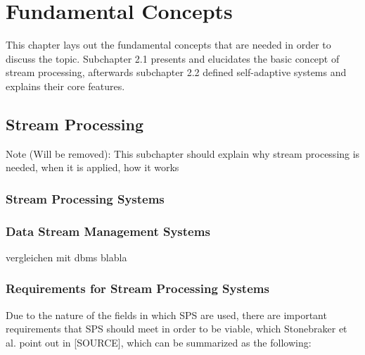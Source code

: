 \chapter{Fundamental Concepts}
This chapter lays out the fundamental concepts that are needed in order to discuss the topic.
Subchapter 2.1 presents and elucidates the basic concept of stream processing, afterwards
subchapter 2.2 defined self-adaptive systems and explains their core features.
    \section{Stream Processing}
    Note (Will be removed): This subchapter should explain why stream processing is needed, when it is applied, how it works
    
        \subsection{Stream Processing Systems}
        \subsection{Data Stream Management Systems}
        vergleichen mit dbms blabla


        \subsection{Requirements for Stream Processing Systems}
        Due to the nature of the fields in which SPS are used, there are important requirements that SPS should meet in order to be viable, 
        which Stonebraker et al. point out in [SOURCE], which can be summarized as the following:
        
